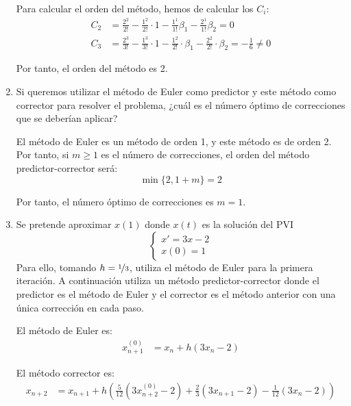 \begin{ejercicio}
\begin{enumerate}
        Para calcular el orden del método, hemos de calcular los $C_i$:
        \begin{align*}
            C_2 &= \frac{2^2}{2!} - \frac{1^2}{2!}\cdot 1 -\frac{1^1}{1!}\beta_1 - \frac{2^1}{1!}\beta_2 = 0\\
            C_3 &= \frac{2^3}{3!} - \frac{1^3}{3!}\cdot 1 - \frac{1^2}{2!}\cdot\beta_1 - \frac{2^2}{2!}\cdot\beta_2 = -\frac{1}{6}\neq 0
        \end{align*}

        Por tanto, el orden del método es 2.
        \item Si queremos utilizar el método de Euler como predictor y este método como corrector para resolver el problema, ¿cuál es el número óptimo de correcciones que se deberían aplicar?
        
        El método de Euler es un método de orden 1, y este método es de orden 2. Por tanto, si $m\geq 1$ es el número de correcciones, el orden del método predictor-corrector será:
        \begin{equation*}
            \min\{2,1+m\} = 2
        \end{equation*}

        Por tanto, el número óptimo de correcciones es $m=1$.
        \item Se pretende aproximar $x(1)$ donde $x(t)$ es la solución del PVI
            \begin{equation*}
                \begin{cases}
                    x' = 3x - 2 \\
                    x(0) = 1
                \end{cases}
            \end{equation*}
            Para ello, tomando $h = \nicefrac{1}{3}$, utiliza el método de Euler para la primera iteración. A continuación utiliza un método predictor-corrector donde el predictor es el método de Euler y el corrector es el método anterior con una única corrección en cada paso.


        El método de Euler es:
        \begin{align*}
            x_{n+1}^{(0)} &= x_n + h(3x_n - 2)
        \end{align*}

        El método corrector es:
        \begin{align*}
            x_{n+2} &= x_{n+1} + h\left(\frac{5}{12}\left(3x_{n+2}^{(0)} - 2\right) + \frac{2}{3}\left(3x_{n+1} - 2\right) - \frac{1}{12}\left(3x_n - 2\right)\right)
        \end{align*}


\end{enumerate}
\end{ejercicio}
